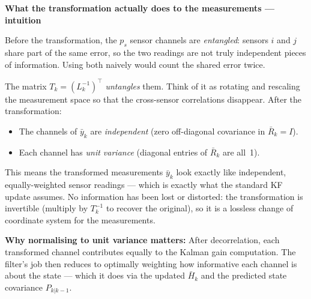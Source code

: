 \documentclass[12pt, a4paper]{article}
\begin{document}
\begin{notebox}
  \textbf{What the transformation actually does to the measurements ---
  intuition}

  Before the transformation, the $p_s$ sensor channels are
  \emph{entangled}: sensors $i$ and $j$ share part of the same error,
  so the two readings are not truly independent pieces of information.
  Using both naively would count the shared error twice.

  The matrix $T_k = (L_k^{-1})^\top$ \emph{untangles} them.
  Think of it as rotating and rescaling the measurement space so that the
  cross-sensor correlations disappear.
  After the transformation:
  \begin{itemize}[leftmargin=1.2em, itemsep=2pt]
    \item The channels of $\bar{y}_k$ are \emph{independent} (zero
      off-diagonal covariance in $\bar{R}_k = I$).
    \item Each channel has \emph{unit variance} (diagonal entries of
      $\bar{R}_k$ are all~1).
  \end{itemize}

  This means the transformed measurements $\bar{y}_k$ look exactly like
  independent, equally-weighted sensor readings --- which is exactly what
  the standard KF update assumes.
  No information has been lost or distorted: the transformation is
  invertible (multiply by $T_k^{-1}$ to recover the original), so it
  is a lossless change of coordinate system for the measurements.

  \textbf{Why normalising to unit variance matters:}
  After decorrelation, each transformed channel contributes equally to
  the Kalman gain computation.
  The filter's job then reduces to optimally weighting how informative
  each channel is about the state --- which it does via the updated
  $\bar{H}_k$ and the predicted state covariance $P_{k|k-1}$.
\end{notebox}
\end{document}

